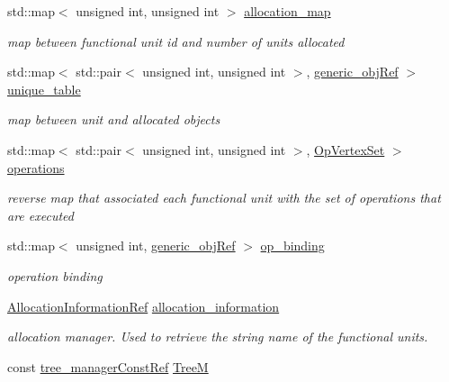 \begin{DoxyCompactItemize}
\item 
std\+::map$<$ unsigned int, unsigned int $>$ \hyperlink{classfu__binding_a0b6cd9a7b230fcd4ab8184683e4ba96f}{allocation\+\_\+map}
\begin{DoxyCompactList}\small\item\em map between functional unit id and number of units allocated \end{DoxyCompactList}\item 
std\+::map$<$ std\+::pair$<$ unsigned int, unsigned int $>$, \hyperlink{generic__obj_8hpp_acb533b2ef8e0fe72e09a04d20904ca81}{generic\+\_\+obj\+Ref} $>$ \hyperlink{classfu__binding_a8a59858eeaefa8845d4a163dd9bdbdcc}{unique\+\_\+table}
\begin{DoxyCompactList}\small\item\em map between unit and allocated objects \end{DoxyCompactList}\item 
std\+::map$<$ std\+::pair$<$ unsigned int, unsigned int $>$, \hyperlink{classOpVertexSet}{Op\+Vertex\+Set} $>$ \hyperlink{classfu__binding_a7317a9846ee0032ec80d2c46b015e29f}{operations}
\begin{DoxyCompactList}\small\item\em reverse map that associated each functional unit with the set of operations that are executed \end{DoxyCompactList}\item 
std\+::map$<$ unsigned int, \hyperlink{generic__obj_8hpp_acb533b2ef8e0fe72e09a04d20904ca81}{generic\+\_\+obj\+Ref} $>$ \hyperlink{classfu__binding_a102dbaa6c6b0e37763ac7f93a668a754}{op\+\_\+binding}
\begin{DoxyCompactList}\small\item\em operation binding \end{DoxyCompactList}\item 
\hyperlink{allocation__information_8hpp_ad90a86da153cba50cbcefc4679036755}{Allocation\+Information\+Ref} \hyperlink{classfu__binding_a35118a88e4276cf592c1e63a96716ac9}{allocation\+\_\+information}
\begin{DoxyCompactList}\small\item\em allocation manager. Used to retrieve the string name of the functional units. \end{DoxyCompactList}\item 
const \hyperlink{tree__manager_8hpp_a792e3f1f892d7d997a8d8a4a12e39346}{tree\+\_\+manager\+Const\+Ref} \hyperlink{classfu__binding_a4de9ee3ee6567c737372884783011a2e}{TreeM}

\end{DoxyCompactItemize}
